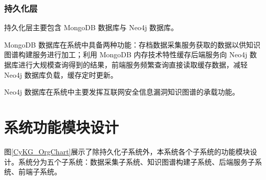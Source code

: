 \documentclass[a4paper,AutoFakeBold,oneside,12pt]{book}
\begin{document}
\subsubsection{持久化层}

持久化层主要包含 MongoDB 数据库与 Neo4j 数据库。

MongoDB 数据库在系统中具备两种功能：存档数据采集服务获取的数据以供知识图谱构建服务进行加工；利用 MongoDB 内存技术特性缓存后端服务向 Neo4j 数据库进行大规模查询得到的结果，前端服务频繁查询直接读取缓存数据，减轻 Neo4j 数据库负载，缓存定时更新。

Neo4j 数据库在系统中主要发挥互联网安全信息漏洞知识图谱的承载功能。

\section{系统功能模块设计}

图\ref{CyKG_OrgChart}展示了除持久化子系统外，本系统各个子系统的功能模块设计。系统分为五个子系统：数据采集子系统、知识图谱构建子系统、后端服务子系统、前端子系统。
\end{document}
